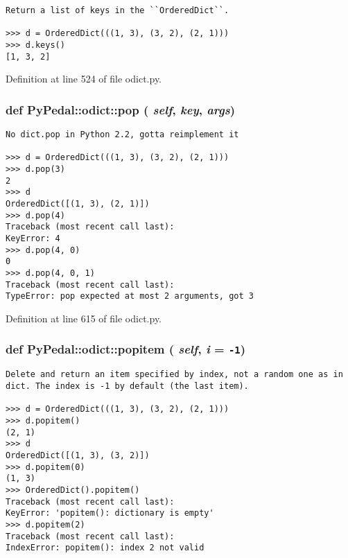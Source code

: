 \footnotesize\begin{verbatim}
Return a list of keys in the ``OrderedDict``.

>>> d = OrderedDict(((1, 3), (3, 2), (2, 1)))
>>> d.keys()
[1, 3, 2]
\end{verbatim}
\normalsize
 

Definition at line 524 of file odict.py.\hypertarget{namespacePyPedal_1_1odict_71d6e063cc9e4e162248d1045fdc13d0}{
\subsubsection{\setlength{\rightskip}{0pt plus 5cm}def PyPedal::odict::pop ( {\em self},  {\em key},  {\em args})}}
\label{namespacePyPedal_1_1odict_71d6e063cc9e4e162248d1045fdc13d0}




\footnotesize\begin{verbatim}
No dict.pop in Python 2.2, gotta reimplement it

>>> d = OrderedDict(((1, 3), (3, 2), (2, 1)))
>>> d.pop(3)
2
>>> d
OrderedDict([(1, 3), (2, 1)])
>>> d.pop(4)
Traceback (most recent call last):
KeyError: 4
>>> d.pop(4, 0)
0
>>> d.pop(4, 0, 1)
Traceback (most recent call last):
TypeError: pop expected at most 2 arguments, got 3
\end{verbatim}
\normalsize
 

Definition at line 615 of file odict.py.\hypertarget{namespacePyPedal_1_1odict_d7321a109a01b3d888de01db1176ead0}{
\subsubsection{\setlength{\rightskip}{0pt plus 5cm}def PyPedal::odict::popitem ( {\em self},  {\em i} = {\tt -1})}}
\label{namespacePyPedal_1_1odict_d7321a109a01b3d888de01db1176ead0}




\footnotesize\begin{verbatim}
Delete and return an item specified by index, not a random one as in
dict. The index is -1 by default (the last item).

>>> d = OrderedDict(((1, 3), (3, 2), (2, 1)))
>>> d.popitem()
(2, 1)
>>> d
OrderedDict([(1, 3), (3, 2)])
>>> d.popitem(0)
(1, 3)
>>> OrderedDict().popitem()
Traceback (most recent call last):
KeyError: 'popitem(): dictionary is empty'
>>> d.popitem(2)
Traceback (most recent call last):
IndexError: popitem(): index 2 not valid
\end{verbatim}
\normalsize
 

